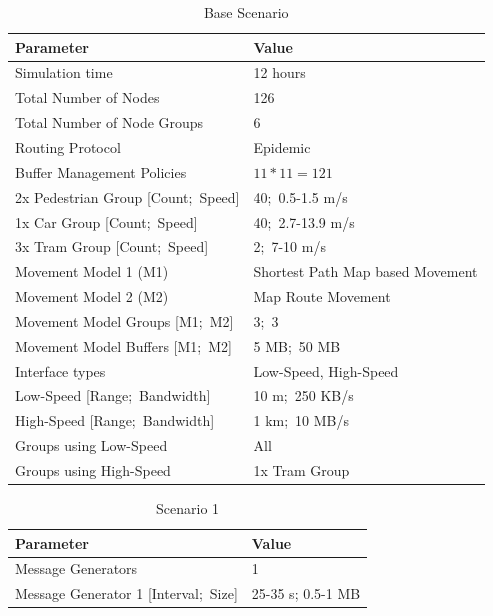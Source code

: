 \documentclass[conference,10pt,letterpaper,final]{IEEEtran}
\begin{document}
\begin{table}[!ht]	
    \begin{tabular}{ | p{} | p{} | }    
    \hline
    Parameter & Value \\ \hline \hline 
    \hline
    Simulation time & 12 hours \\ \hline
    Total Number of Nodes & 126 \\ \hline
    Total Number of Node Groups & 6 \\ \hline \hline    
    Routing Protocol & Epidemic \\ \hline
    Buffer Management Policies & $11 * 11 = 121$ \\ \hline
    2x Pedestrian Group [Count;~Speed] & 40;~0.5-1.5 m/s  \\ \hline
	1x Car Group [Count;~Speed] & 40;~2.7-13.9 m/s  \\ \hline
	3x Tram Group [Count;~Speed] & 2;~7-10 m/s  \\ \hline \hline
    Movement Model 1 (M1) & Shortest Path Map based Movement \\ \hline
    Movement Model 2 (M2) & Map Route Movement \\ \hline    
    Movement Model Groups [M1;~M2] &  3;~3 \\ \hline
    Movement Model Buffers [M1;~M2] & 5 MB;~50 MB \\ \hline \hline
    Interface types & Low-Speed, High-Speed \\ \hline
    Low-Speed [Range;~Bandwidth] & 10 m;~250 KB/s \\ \hline
    High-Speed [Range;~Bandwidth] & 1 km;~10 MB/s \\ \hline
    Groups using Low-Speed & All \\ \hline
    Groups using High-Speed & 1x Tram Group \\ \hline \hline    
    \end{tabular}
    
    \vspace{0.2cm}
    \caption{Base Scenario}
    \label{table:basescenario}
\end{table}

\begin{table}[!ht]
	

    \begin{tabular}{ | p{} | p{} | }    
    \hline
    Parameter & Value \\ \hline \hline 
    \hline
    Message Generators & 1 \\ \hline
    Message Generator 1 [Interval;~Size] & 25-35 s; 0.5-1 MB \\ \hline 
    \hline
    \end{tabular}
    
    \vspace{0.2cm}
    \caption{Scenario 1}
    \label{table:scenario1}
\end{table}
\end{document}
